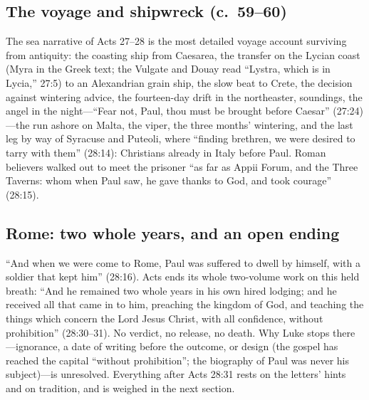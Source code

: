 \subsection{The voyage and shipwreck (c.~59--60)}

The sea narrative of Acts 27--28 is the most detailed voyage account
surviving from antiquity: the coasting ship from Caesarea, the transfer
on the Lycian coast (Myra in the Greek text; the Vulgate and Douay read
``Lystra, which is in Lycia,'' 27:5) to an Alexandrian grain ship, the slow beat to Crete, the
decision against wintering advice, the fourteen-day drift in the
northeaster, soundings, the angel in the night---``Fear not, Paul, thou
must be brought before Caesar'' (27:24)---the run ashore on Malta, the
viper, the three months' wintering, and the last leg by way of Syracuse
and Puteoli, where ``finding brethren, we were desired to tarry with
them'' (28:14): Christians already in Italy before Paul. Roman believers
walked out to meet the prisoner ``as far as Appii Forum, and the Three
Taverns: whom when Paul saw, he gave thanks to God, and took courage''
(28:15).

\subsection{Rome: two whole years, and an open ending}

``And when we were come to Rome, Paul was suffered to dwell by himself,
with a soldier that kept him'' (28:16). Acts ends its whole two-volume
work on this held breath: ``And he remained two whole years in his own
hired lodging; and he received all that came in to him, preaching the
kingdom of God, and teaching the things which concern the Lord Jesus
Christ, with all confidence, without prohibition'' (28:30--31). No
verdict, no release, no death. Why Luke stops there---ignorance, a date
of writing before the outcome, or design (the gospel has reached the
capital ``without prohibition''; the biography of Paul was never his
subject)---is unresolved. Everything after Acts 28:31 rests on the
letters' hints and on tradition, and is weighed in the next section.
